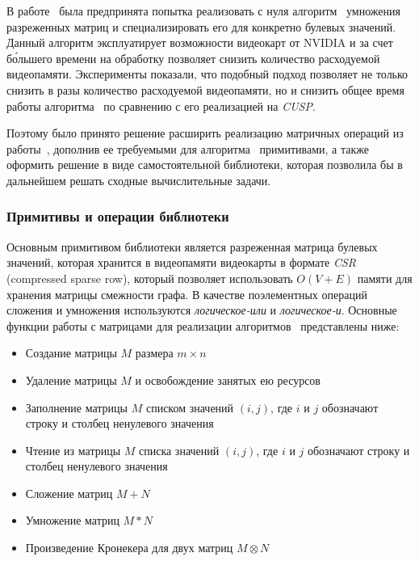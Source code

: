 В работе~\cite{inproceedings:cfqp_matrix_with_single_source} была предпринята попытка реализовать с нуля алгоритм~\cite{inproceedings:spgemm_mem_saving_for_nvidia} умножения разреженных матриц и специализировать его для конкретно булевых значений. Данный алгоритм эксплуатирует возможности  видеокарт от NVIDIA и за счет б\'ольшего времени на обработку позволяет снизить количество расходуемой видеопамяти. Эксперименты показали, что подобный подход позволяет не только снизить в разы количество расходуемой видеопамяти, но и снизить общее время работы алгоритма~\cite{inproceedings:matrix_cfpq} по сравнению с его реализацией на \textit{CUSP}. 

Поэтому было принято решение расширить реализацию матричных операций из работы~\cite{inproceedings:cfqp_matrix_with_single_source}, дополнив ее требуемыми для алгоритма~\cite{inbook:kronecker_cfpq_adbis} примитивами, а также оформить решение в виде самостоятельной библиотеки, которая позволила бы в дальнейшем решать сходные вычислительные задачи.

\subsubsection{Примитивы и операции библиотеки}

Основным примитивом библиотеки является разреженная матрица булевых значений, которая хранится в видеопамяти видеокарты в формате \textit{CSR} (compressed sparse row), который позволяет использовать $O(V + E)$ памяти для хранения матрицы смежности графа. В качестве поэлементных операций сложения и умножения используются \textit{логическое-или} и \textit{логическое-и}. Основные функции работы с матрицами для реализации алгоритмов~\cite{inproceedings:cfqp_matrix_with_single_source, inbook:kronecker_cfpq_adbis} представлены ниже:

\begin{itemize}
    \item Создание матрицы $M$ размера $m \times n$
    \item Удаление матрицы $M$ и освобождение занятых ею ресурсов
    \item Заполнение матрицы $M$ списком значений $(i, j)$, где $i$ и $j$ обозначают строку и столбец ненулевого значения
    \item Чтение из матрицы $M$ списка значений $(i, j)$, где $i$ и $j$ обозначают строку и столбец ненулевого значения
    \item Сложение матриц $M + N$
    \item Умножение матриц $M * N$
    \item Произведение Кронекера для двух матриц $M \otimes N$
\end{itemize}

